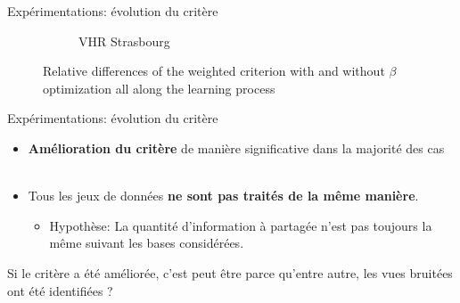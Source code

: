 \documentclass[hyperref={pdfpagelabels=false}]{beamer}
\begin{document}
\begin{frame}{Expérimentations: évolution du critère}
\begin{figure}[!h]
\begin{subfigure}[b]{0.32\textwidth}
                \caption{VHR Strasbourg}
            \end{subfigure}
            \caption{Relative differences of the weighted criterion with 
                and without $\beta$ optimization all along the learning 
                process
            }
        \end{figure}
    \end{frame}

    \begin{frame}{Expérimentations: évolution du critère}
        \begin{itemize}
            \item \textbf{Amélioration du critère} de manière 
                significative dans la majorité des cas\\~\\
            \item Tous les jeux de données \textbf{ne sont pas traités 
                de la même manière}.
                \begin{itemize}
                    \item Hypothèse: La quantité d'information à 
                        partagée n'est pas toujours la même suivant les 
                        bases considérées.
                \end{itemize}
        \end{itemize}

        Si le critère a été améliorée, c'est peut être parce qu'entre 
        autre, les vues bruitées ont été identifiées ?
    \end{frame}
\end{document}

